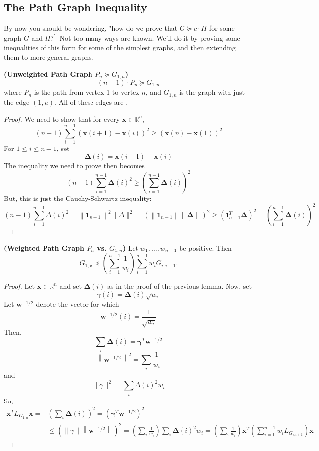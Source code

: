 \documentclass{article}
\newcommand{\bfs}[1]{\textbf{({#1}) }}
\begin{document}
\subsection{The Path Graph Inequality}
By now you should be wondering, "how do we prove that $G \succcurlyeq c \cdot H$ for some graph $G$ and $H ?^{\prime \prime}$ Not too many ways are known. We'll do it by proving some inequalities of this form for some of the simplest graphs, and then extending them to more general graphs.
\begin{lema}{\bfs{Unweighted Path Graph $P_{n} \succcurlyeq G_{1, n}$}}\label{be:lemma1}
$$
(n-1) \cdot P_{n} \succcurlyeq G_{1, n}
$$
where $P_{n}$ is the path from vertex 1 to vertex $n$, and $G_{1, n}$ is the graph with just the edge $(1, n)$. All of these edges are .
\end{lema}
\begin{proof}
We need to show that for every $\boldsymbol{x} \in \mathbb{R}^{n}$,
$$
(n-1) \sum_{i=1}^{n-1}(\boldsymbol{x}(i+1)-\boldsymbol{x}(i))^{2} \geq(\boldsymbol{x}(n)-\boldsymbol{x}(1))^{2}
$$
For $1 \leq i \leq n-1$, set
$$
\boldsymbol{\Delta}(i)=\boldsymbol{x}(i+1)-\boldsymbol{x}(i)
$$
The inequality we need to prove then becomes
$$
(n-1) \sum_{i=1}^{n-1} \boldsymbol{\Delta}(i)^{2} \geq\left(\sum_{i=1}^{n-1} \boldsymbol{\Delta}(i)\right)^{2}
$$
But, this is just the Cauchy-Schwartz inequality:
$$
(n-1) \sum_{i=1}^{n-1} \Delta(i)^{2}=\left\|\mathbf{1}_{n-1}\right\|^{2}\|\Delta\|^{2}=\left(\left\|\mathbf{1}_{n-1}\right\|\|\boldsymbol{\Delta}\|\right)^{2} \geq\left(\mathbf{1}_{n-1}^{T} \boldsymbol{\Delta}\right)^{2}=\left(\sum_{i=1}^{n-1} \boldsymbol{\Delta}(i)\right)^{2}
$$
\end{proof}
\begin{lema}{\bfs{Weighted Path Graph $P_{n}$ vs. $G_{1, n}$}}
Let $w_{1}, \ldots, w_{n-1}$ be positive. Then
$$
G_{1, n} \preccurlyeq\left(\sum_{i=1}^{n-1} \frac{1}{w_{i}}\right) \sum_{i=1}^{n-1} w_{i} G_{i, i+1} .
$$
\end{lema}
\begin{proof}
Let $\boldsymbol{x} \in \mathbb{R}^{n}$ and set $\boldsymbol{\Delta}(i)$ as in the proof of the previous lemma. Now, set
$$
\gamma(i)=\boldsymbol{\Delta}(i) \sqrt{w_{i}}
$$
Let $\boldsymbol{w}^{-1 / 2}$ denote the vector for which
$$
\boldsymbol{w}^{-1 / 2}(i)=\frac{1}{\sqrt{w_{i}}}
$$
Then,
$$
\sum_{i} \boldsymbol{\Delta}(i)=\boldsymbol{\gamma}^{T} \boldsymbol{w}^{-1 / 2}
$$
$$
\left\|\boldsymbol{w}^{-1 / 2}\right\|^{2}=\sum_{i} \frac{1}{w_{i}}
$$
and
$$
\|\gamma\|^{2}=\sum_{i} \Delta(i)^{2} w_{i}
$$
So,
$$
\begin{aligned}
\boldsymbol{x}^{T} L_{G_{1, n}} \boldsymbol{x}=&\left(\sum_{i} \boldsymbol{\Delta}(i)\right)^{2}=\left(\boldsymbol{\gamma}^{T} \boldsymbol{w}^{-1 / 2}\right)^{2} \\
& \leq\left(\|\gamma\|\left\|\boldsymbol{w}^{-1 / 2}\right\|\right)^{2}=\left(\sum_{i} \frac{1}{w_{i}}\right) \sum_{i} \boldsymbol{\Delta}(i)^{2} w_{i}=\left(\sum_{i} \frac{1}{w_{i}}\right) \boldsymbol{x}^{T}\left(\sum_{i=1}^{n-1} w_{i} L_{G_{i, i+1}}\right) \boldsymbol{x}
\end{aligned}
$$
\end{proof} 
\end{document}
